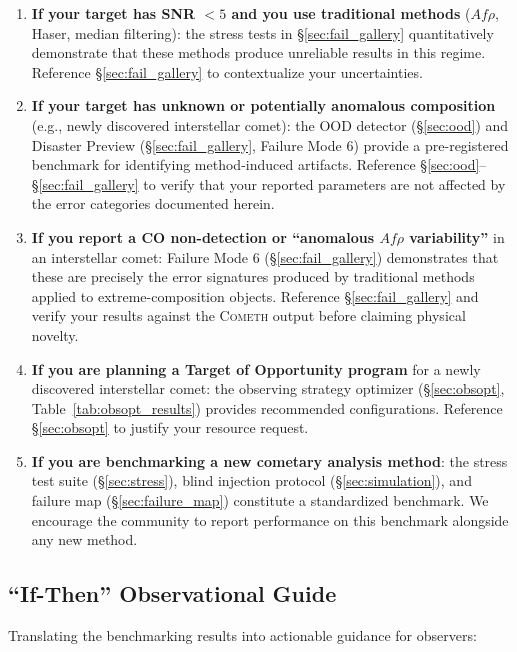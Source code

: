 \documentclass[preprint2]{aastex631}
\begin{document}
\begin{enumerate}
    \item \textbf{If your target has SNR $<5$ and you use traditional methods} ($Af\rho$, Haser, median filtering): the stress tests in \S\ref{sec:fail_gallery} quantitatively demonstrate that these methods produce unreliable results in this regime. Reference \S\ref{sec:fail_gallery} to contextualize your uncertainties.
    \item \textbf{If your target has unknown or potentially anomalous composition} (e.g., newly discovered interstellar comet): the OOD detector (\S\ref{sec:ood}) and Disaster Preview (\S\ref{sec:fail_gallery}, Failure Mode 6) provide a pre-registered benchmark for identifying method-induced artifacts. Reference \S\ref{sec:ood}--\S\ref{sec:fail_gallery} to verify that your reported parameters are not affected by the error categories documented herein.
    \item \textbf{If you report a CO non-detection or ``anomalous $Af\rho$ variability''} in an interstellar comet: Failure Mode 6 (\S\ref{sec:fail_gallery}) demonstrates that these are precisely the error signatures produced by traditional methods applied to extreme-composition objects. Reference \S\ref{sec:fail_gallery} and verify your results against the \textsc{Cometh} output before claiming physical novelty.
    \item \textbf{If you are planning a Target of Opportunity program} for a newly discovered interstellar comet: the observing strategy optimizer (\S\ref{sec:obsopt}, Table~\ref{tab:obsopt_results}) provides recommended configurations. Reference \S\ref{sec:obsopt} to justify your resource request.
    \item \textbf{If you are benchmarking a new cometary analysis method}: the stress test suite (\S\ref{sec:stress}), blind injection protocol (\S\ref{sec:simulation}), and failure map (\S\ref{sec:failure_map}) constitute a standardized benchmark. We encourage the community to report performance on this benchmark alongside any new method.
\end{enumerate}

\subsection{``If-Then'' Observational Guide}\label{sec:ifthen}

Translating the benchmarking results into actionable guidance for observers:
\end{document}
